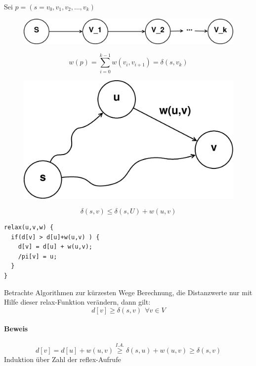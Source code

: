 Sei $p=(s=v_0,v_1,v_2,\ldots,v_k)$
\begin{figure}[h]
	\centering
	\includegraphics[width=0.3\linewidth]{16/Grafik/Dijkstra2}
	\caption{}
	\label{fig:Dijkstra2}
	\end{figure}
\[ w(p) = \sum_{i=0}^{k-1}w(v_i,v_{i+1})=\delta(s,v_k) \]
\begin{figure}[h]
	\centering
	\includegraphics[width=0.3\linewidth]{16/Grafik/dijkstra3}
	\caption{}
	\label{fig:Dijkstra3}
	\end{figure}
\[ \delta(s,v)\leq \delta(s,U)+w(u,v) \]
\begin{lstlisting}
relax(u,v,w) {
  if(d[v] > d[u]+w(u,v) ) {
    d[v] = d[u] + w(u,v);
    /pi[v] = u;
  }
}
\end{lstlisting}
Betrachte Algorithmen zur kürzesten Wege Berechnung, die Distanzwerte nur mit Hilfe dieser relax-Funktion verändern, dann gilt:
\[ d[v] \geq \delta(s,v)~~\forall v\in V \]
\paragraph{Beweis}
\[ d[v] = d[u]+w(u,v) \overset{I.A.}{\geq} \delta(s,u)+w(u,v) \geq \delta(s,v) \]
Induktion über Zahl der reflex-Aufrufe